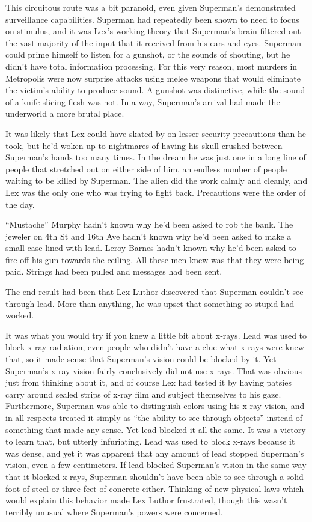 \documentclass[ebook,12pt]{memoir}
\begin{document}
This circuitous route was a bit paranoid, even given Superman's
demonstrated surveillance capabilities. Superman had repeatedly been
shown to need to focus on stimulus, and it was Lex's working theory that
Superman's brain filtered out the vast majority of the input that it
received from his ears and eyes. Superman could prime himself to listen
for a gunshot, or the sounds of shouting, but he didn't have total
information processing. For this very reason, most murders in Metropolis
were now surprise attacks using melee weapons that would eliminate the
victim's ability to produce sound. A gunshot was distinctive, while the
sound of a knife slicing flesh was not. In a way, Superman's arrival had
made the underworld a more brutal place.

It was likely that Lex could have skated by on lesser security
precautions than he took, but he'd woken up to nightmares of having his
skull crushed between Superman's hands too many times. In the dream he
was just one in a long line of people that stretched out on either side
of him, an endless number of people waiting to be killed by Superman.
The alien did the work calmly and cleanly, and Lex was the only one who
was trying to fight back. Precautions were the order of the day.

``Mustache'' Murphy hadn't known why he'd been asked to rob the bank.
The jeweler on 4th St and 16th Ave hadn't known why he'd been asked to
make a small case lined with lead. Leroy Barnes hadn't known why he'd
been asked to fire off his gun towards the ceiling. All these men knew
was that they were being paid. Strings had been pulled and messages had
been sent.

The end result had been that Lex Luthor discovered that Superman
couldn't see through lead. More than anything, he was upset that
something so stupid had worked.

It was what you would try if you knew a little bit about x‐rays. Lead
was used to block x‐ray radiation, even people who didn't have a clue
what x‐rays were knew that, so it made sense that Superman's vision
could be blocked by it. Yet Superman's x‐ray vision fairly conclusively
did not use x‐rays. That was obvious just from thinking about it, and of
course Lex had tested it by having patsies carry around sealed strips of
x‐ray film and subject themselves to his gaze. Furthermore, Superman was
able to distinguish colors using his x‐ray vision, and in all respects
treated it simply as ``the ability to see through objects'' instead of
something that made any sense. Yet lead blocked it all the same. It was
a victory to learn that, but utterly infuriating. Lead was used to block
x‐rays because it was dense, and yet it was apparent that any amount of
lead stopped Superman's vision, even a few centimeters. If lead blocked
Superman's vision in the same way that it blocked x‐rays, Superman
shouldn't have been able to see through a solid foot of steel or three
feet of concrete either. Thinking of new physical laws which would
explain this behavior made Lex Luthor frustrated, though this wasn't
terribly unusual where Superman's powers were concerned.
\end{document}
